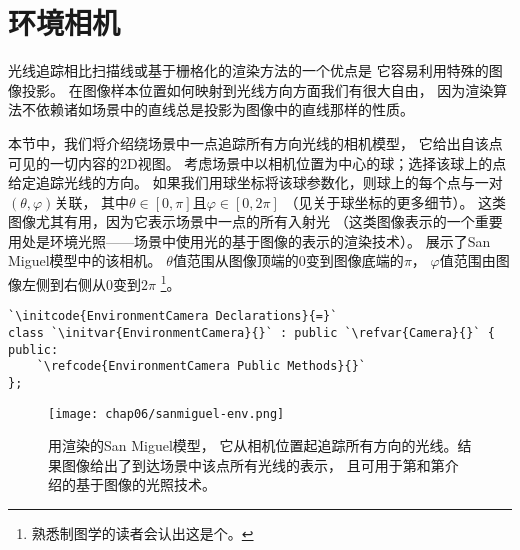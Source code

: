 \section{环境相机}\label{sec:环境相机}
光线追踪相比扫描线或基于栅格化的渲染方法的一个优点是
它容易利用特殊的图像投影。
在图像样本位置如何映射到光线方向方面我们有很大自由，
因为渲染算法不依赖诸如场景中的直线总是投影为图像中的直线那样的性质。

本节中，我们将介绍绕场景中一点追踪所有方向光线的相机模型，
它给出自该点可见的一切内容的2D视图。
考虑场景中以相机位置为中心的球；选择该球上的点给定追踪光线的方向。
如果我们用球坐标将该球参数化，则球上的每个点与一对$(\theta,\varphi)$关联，
其中$\theta\in[0,\pi]$且$\varphi\in[0,2\pi]$
（见关于球坐标的更多细节）。
这类图像尤其有用，因为它表示场景中一点的所有入射光
（这类图像表示的一个重要用处是环境光照——场景中使用光的基于图像的表示的渲染技术）。
展示了San Miguel模型中的该相机。
$\theta$值范围从图像顶端的0变到图像底端的$\pi$，
$\varphi$值范围由图像左侧到右侧从0变到$2\pi$
\footnote{熟悉制图学的读者会认出这是个。}。
\begin{lstlisting}
`\initcode{EnvironmentCamera Declarations}{=}`
class `\initvar{EnvironmentCamera}{}` : public `\refvar{Camera}{}` {
public:
    `\refcode{EnvironmentCamera Public Methods}{}`
};
\end{lstlisting}
\begin{figure}[htbp]
    \centering\texttt{[image: chap06/sanmiguel-env.png]}
    \caption{用渲染的San Miguel模型，
    它从相机位置起追踪所有方向的光线。结果图像给出了到达场景中该点所有光线的表示，
    且可用于第和第介绍的基于图像的光照技术。}
    \label{fig:6.14}
\end{figure}

